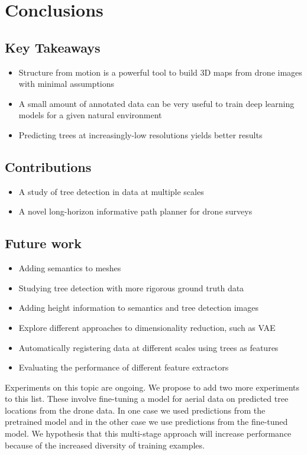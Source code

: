 
\chapter{Conclusions} \label{chapConclusions}
\section{Key Takeaways}
\begin{itemize}
    \item Structure from motion is a powerful tool to build 3D maps from drone images with minimal assumptions
    \item A small amount of annotated data can be very useful to train deep learning models for a given natural environment
    \item Predicting trees at increasingly-low resolutions yields better results 
\end{itemize}
\section{Contributions}
\begin{itemize}
    \item A study of tree detection in data at multiple scales 
    \item A novel long-horizon informative path planner for drone surveys
\end{itemize}
\section{Future work}
\begin{itemize}
    \item Adding semantics to meshes 
    \item Studying tree detection with more rigorous ground truth data
    \item Adding height information to semantics and tree detection images
    \item Explore different approaches to dimensionality reduction, such as VAE
    \item Automatically registering data at different scales using trees as features
    \item Evaluating the performance of different feature extractors
\end{itemize}

Experiments on this topic are ongoing. We propose to add two more experiments to this list. These involve fine-tuning a model for aerial data on predicted tree locations from the drone data. In one case we used predictions from the pretrained model and in the other case we use predictions from the fine-tuned model. We hypothesis that this multi-stage approach will increase performance because of the increased diversity of training examples.  

